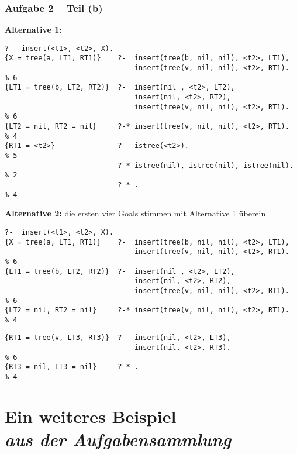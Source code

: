 \documentclass{beamer}
\begin{document}
\begin{frame}[fragile] \frametitle{Aufgabe 2 -- Teil (b)}
	\footnotesize
	
	\textbf{Alternative 1:}
	\begin{lstlisting}[style=refutation, basicstyle=\ttfamily\tiny]
                           ?-  insert(<t1>, <t2>, X).
{X = tree(a, LT1, RT1)}    ?-  insert(tree(b, nil, nil), <t2>, LT1), 
                               insert(tree(v, nil, nil), <t2>, RT1).   % 6
{LT1 = tree(b, LT2, RT2)}  ?-  insert(nil , <t2>, LT2), 
                               insert(nil, <t2>, RT2), 
                               insert(tree(v, nil, nil), <t2>, RT1).   % 6
{LT2 = nil, RT2 = nil}     ?-* insert(tree(v, nil, nil), <t2>, RT1).   % 4
{RT1 = <t2>}               ?-  istree(<t2>).                           % 5
                           ?-* istree(nil), istree(nil), istree(nil).  % 2
                           ?-* .                                       % 4
	\end{lstlisting}

	\textbf{Alternative 2:} 
	{\tiny die ersten vier Goals stimmen mit Alternative 1 überein}
	\begin{lstlisting}[style=refutation, basicstyle=\ttfamily\tiny\color{cdgray}]
                           ?-  insert(<t1>, <t2>, X).
{X = tree(a, LT1, RT1)}    ?-  insert(tree(b, nil, nil), <t2>, LT1), 
                               insert(tree(v, nil, nil), <t2>, RT1).   % 6
{LT1 = tree(b, LT2, RT2)}  ?-  insert(nil , <t2>, LT2), 
                               insert(nil, <t2>, RT2), 
                               insert(tree(v, nil, nil), <t2>, RT1).   % 6
{LT2 = nil, RT2 = nil}     ?-* insert(tree(v, nil, nil), <t2>, RT1).   % 4
	\end{lstlisting} \vspace{-.5\baselineskip}
	\begin{lstlisting}[style=refutation, basicstyle=\ttfamily\tiny]
{RT1 = tree(v, LT3, RT3)}  ?-  insert(nil, <t2>, LT3),
                               insert(nil, <t2>, RT3).                 % 6
{RT3 = nil, LT3 = nil}     ?-* .                                       % 4
	\end{lstlisting}

\end{frame}


\section{Ein weiteres Beispiel \\ \itshape \normalsize aus der Aufgabensammlung}
\end{document}
